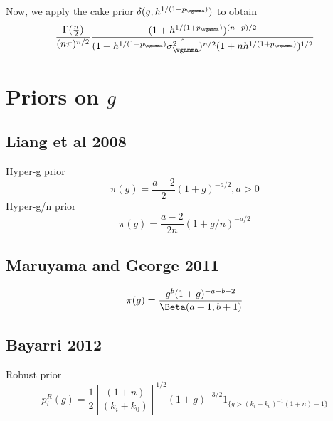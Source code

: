 Now, we apply the cake prior $\delta(g; h^{1/(1 + p_\vgamma)})$ to obtain
\[
	\frac{\Gamma(\frac{n}{2})}{(n \pi)^{n/2}} \frac{(1 + h^{1/(1 + p_\vgamma)})^{(n-p)/2}}{(1 + h^{1/(1 + p_\vgamma)} \hat{\sigma^2_\vgamma})^{n/2} (1 + nh^{1/(1 + p_\vgamma)})^{1/2}}
\]

\section{Priors on $g$}

\subsection{Liang et al 2008}
\citep{Liang2008}
Hyper-g prior
$$\pi(g) = \frac{a - 2}{2} (1 + g)^{-a/2}, a > 0$$
Hyper-g/n prior
$$\pi(g) = \frac{a - 2}{2n} (1 + g/n)^{-a/2}$$
\subsection{Maruyama and George 2011}
\citep{Maruyama2011}
$$\pi(g) = \frac{g^b (1 + g)^{-a-b-2}}{\Beta(a + 1, b + 1)}$$
\subsection{Bayarri 2012}
\citep{Bayarri2012}
Robust prior
$$p_i^R(g) = \frac{1}{2} \left[ \frac{(1 + n)}{(k_i + k_0)} \right]^{1/2} (1 + g)^{-3/2} 1_{\{ g > (k_i + k_0)^{-1} (1 + n) - 1 \}}$$
